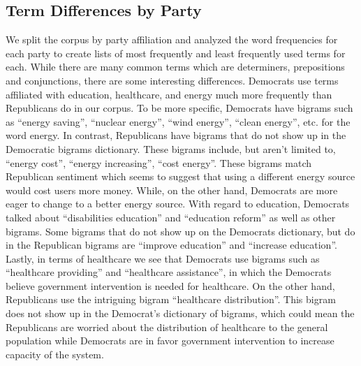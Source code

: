 \documentclass[a4paper, 12pt]{article}
\begin{document}
\subsection{Term Differences by Party}
We split the corpus by party affiliation and analyzed the word frequencies for each party to create lists of most frequently and least frequently used terms for each. While there are many common terms which are determiners, prepositions and conjunctions, there are some interesting differences. Democrats use terms affiliated with education, healthcare, and energy much more frequently than Republicans do in our corpus. 
To be more specific, Democrats have bigrams such as ``energy saving'', ``nuclear energy'', ``wind energy'', ``clean energy'', etc. for the word energy. In contrast, Republicans have bigrams that do not show up in the Democratic bigrams dictionary. These bigrams include, but aren't limited to, ``energy cost'', ``energy increasing'', ``cost energy''. These bigrams match Republican sentiment which seems to suggest that using a different energy source would cost users more money. While, on the other hand, Democrats are more eager to change to a better energy source. With regard to education, Democrats talked about ``disabilities education'' and ``education reform'' as well as other bigrams. Some bigrams that do not show up on the Democrats dictionary, but do in the Republican bigrams are ``improve education'' and ``increase education''. Lastly, in terms of healthcare we see that Democrats use bigrams such as ``healthcare providing'' and ``healthcare assistance'', in which the Democrats believe government intervention is needed for healthcare. On the other hand, Republicans use the intriguing bigram ``healthcare distribution''. This bigram does not show up in the Democrat's dictionary of bigrams, which could mean the Republicans are worried about the distribution of healthcare to the general population while Democrats are in favor government intervention to increase capacity  of the system. 
\end{document}
